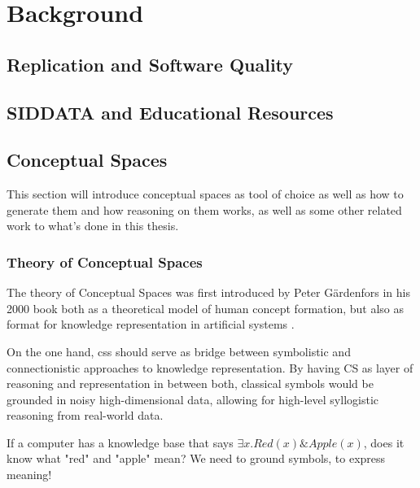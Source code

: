 \chapter{Background}


\section{Replication and Software Quality}


\section{SIDDATA and Educational Resources}


\section{Conceptual Spaces}

This section will introduce conceptual spaces as tool of choice as well as how to generate them and how reasoning on them works, as well as some other related work to what's done in this thesis.

\subsection*{Theory of Conceptual Spaces}

The theory of Conceptual Spaces was first introduced by Peter Gärdenfors in his 2000 book  \cite{Gardenfors2000a} both as a theoretical model of human concept formation, but also as format for knowledge representation in artificial systems \cite{Gardenfors2004}. 

On the one hand, \glspl{cs} should serve as bridge between symbolistic and connectionistic approaches to knowledge representation. By having CS as layer of reasoning and representation in between both, classical symbols would be grounded in noisy high-dimensional data, allowing for high-level syllogistic reasoning from real-world data. 

If a computer has a knowledge base that says $\exists x.Red(x) \& Apple(x)$, does it know what "red" and "apple" mean? We need to ground symbols, to express meaning!

